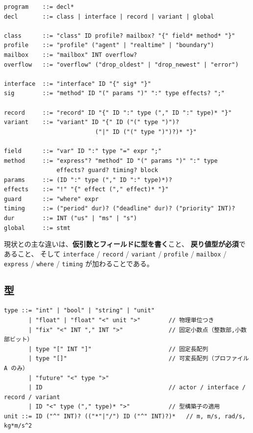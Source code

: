 \documentclass[11pt,a4paper]{ltjsarticle}
\theoremstyle{remark}
\begin{document}
\begin{lstlisting}[language={}]
program    ::= decl*
decl       ::= class | interface | record | variant | global

class      ::= "class" ID profile? mailbox? "{" field* method* "}"
profile    ::= "profile" ("agent" | "realtime" | "boundary")
mailbox    ::= "mailbox" INT overflow?
overflow   ::= "overflow" ("drop_oldest" | "drop_newest" | "error")

interface  ::= "interface" ID "{" sig* "}"
sig        ::= "method" ID "(" params ")" ":" type effects? ";"

record     ::= "record" ID "{" ID ":" type ("," ID ":" type)* "}"
variant    ::= "variant" ID "{" ID ("(" type ")")?
                          ("|" ID ("(" type ")")?)* "}"

field      ::= "var" ID ":" type "=" expr ";"
method     ::= "express"? "method" ID "(" params ")" ":" type
               effects? guard? timing? block
params     ::= (ID ":" type ("," ID ":" type)*)?
effects    ::= "!" "{" effect ("," effect)* "}"
guard      ::= "where" expr
timing     ::= ("period" dur)? ("deadline" dur)? ("priority" INT)?
dur        ::= INT ("us" | "ms" | "s")
global     ::= stmt
\end{lstlisting}

現状との主な違いは、\textbf{仮引数とフィールドに型を書く}こと、
\textbf{戻り値型が必須}であること、
そして \texttt{interface} / \texttt{record} / \texttt{variant} /
\texttt{profile} / \texttt{mailbox} / \texttt{express} /
\texttt{where} / \texttt{timing} が加わることである。

\subsection{型}

\begin{lstlisting}[language={}]
type ::= "int" | "bool" | "string" | "unit"
       | "float" | "float" "<" unit ">"        // 物理単位つき
       | "fix" "<" INT "," INT ">"             // 固定小数点（整数部,小数部ビット）
       | type "[" INT "]"                      // 固定長配列
       | type "[]"                             // 可変長配列（プロファイル A のみ）
       | "future" "<" type ">"
       | ID                                    // actor / interface / record / variant
       | ID "<" type ("," type)* ">"           // 型構築子の適用
unit ::= ID ("^" INT)? (("*"|"/") ID ("^" INT)?)*   // m, m/s, rad/s, kg*m/s^2
\end{lstlisting}
\end{document}
